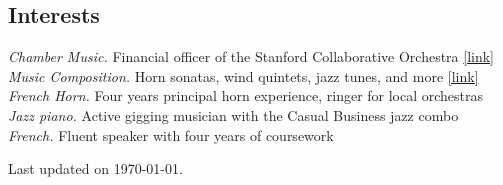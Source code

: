 \documentclass[margin, 10pt]{res}
\begin{document}
\begin{resume}
\section{Interests}

\textit{Chamber Music.} Financial officer of the Stanford Collaborative Orchestra \href{https://scor.stanford.edu}{[link]} \\
\textit{Music Composition.} Horn sonatas, wind quintets, jazz tunes, and more \href{https://stanford.edu/~jeffjar/music.html}{[link]} \\
\textit{French Horn.} Four years principal horn experience, ringer for local orchestras \\
\textit{Jazz piano.} Active gigging musician with the Casual Business jazz combo \\
\textit{French.} Fluent speaker with four years of coursework

\end{resume}

\vfill\hfill{\scriptsize Last updated on \today.}
\end{document}
